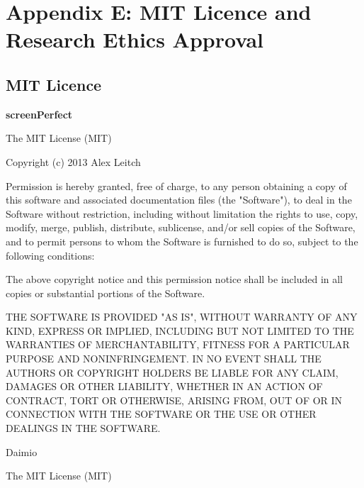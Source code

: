 
\chapter{Appendix E: MIT Licence and Research Ethics Approval} %

\label{AppendixE} %



\section{MIT Licence}

\textbf{screenPerfect}

The MIT License (MIT)

Copyright (c) 2013 Alex Leitch

Permission is hereby granted, free of charge, to any person obtaining a copy of this software and associated documentation files (the "Software"), to deal in the Software without restriction, including without limitation the rights to use, copy, modify, merge, publish, distribute, sublicense, and/or sell copies of the Software, and to permit persons to whom the Software is furnished to do so, subject to the following conditions:

The above copyright notice and this permission notice shall be included in all copies or substantial portions of the Software.

THE SOFTWARE IS PROVIDED "AS IS", WITHOUT WARRANTY OF ANY KIND, EXPRESS OR IMPLIED, INCLUDING BUT NOT LIMITED TO THE WARRANTIES OF MERCHANTABILITY, FITNESS FOR A PARTICULAR PURPOSE AND NONINFRINGEMENT. IN NO EVENT SHALL THE AUTHORS OR COPYRIGHT HOLDERS BE LIABLE FOR ANY CLAIM, DAMAGES OR OTHER LIABILITY, WHETHER IN AN ACTION OF CONTRACT, TORT OR OTHERWISE, ARISING FROM, OUT OF OR IN CONNECTION WITH THE SOFTWARE OR THE USE OR OTHER DEALINGS IN THE SOFTWARE.

Daimio

The MIT License (MIT)

